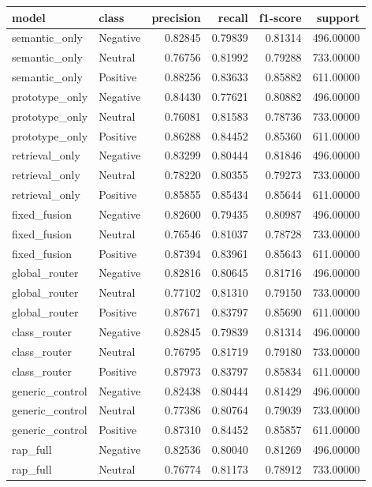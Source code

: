 \begin{tabular}{llrrrr}
\toprule
model & class & precision & recall & f1-score & support \\
\midrule
semantic_only & Negative & 0.82845 & 0.79839 & 0.81314 & 496.00000 \\
semantic_only & Neutral & 0.76756 & 0.81992 & 0.79288 & 733.00000 \\
semantic_only & Positive & 0.88256 & 0.83633 & 0.85882 & 611.00000 \\
prototype_only & Negative & 0.84430 & 0.77621 & 0.80882 & 496.00000 \\
prototype_only & Neutral & 0.76081 & 0.81583 & 0.78736 & 733.00000 \\
prototype_only & Positive & 0.86288 & 0.84452 & 0.85360 & 611.00000 \\
retrieval_only & Negative & 0.83299 & 0.80444 & 0.81846 & 496.00000 \\
retrieval_only & Neutral & 0.78220 & 0.80355 & 0.79273 & 733.00000 \\
retrieval_only & Positive & 0.85855 & 0.85434 & 0.85644 & 611.00000 \\
fixed_fusion & Negative & 0.82600 & 0.79435 & 0.80987 & 496.00000 \\
fixed_fusion & Neutral & 0.76546 & 0.81037 & 0.78728 & 733.00000 \\
fixed_fusion & Positive & 0.87394 & 0.83961 & 0.85643 & 611.00000 \\
global_router & Negative & 0.82816 & 0.80645 & 0.81716 & 496.00000 \\
global_router & Neutral & 0.77102 & 0.81310 & 0.79150 & 733.00000 \\
global_router & Positive & 0.87671 & 0.83797 & 0.85690 & 611.00000 \\
class_router & Negative & 0.82845 & 0.79839 & 0.81314 & 496.00000 \\
class_router & Neutral & 0.76795 & 0.81719 & 0.79180 & 733.00000 \\
class_router & Positive & 0.87973 & 0.83797 & 0.85834 & 611.00000 \\
generic_control & Negative & 0.82438 & 0.80444 & 0.81429 & 496.00000 \\
generic_control & Neutral & 0.77386 & 0.80764 & 0.79039 & 733.00000 \\
generic_control & Positive & 0.87310 & 0.84452 & 0.85857 & 611.00000 \\
rap_full & Negative & 0.82536 & 0.80040 & 0.81269 & 496.00000 \\
rap_full & Neutral & 0.76774 & 0.81173 & 0.78912 & 733.00000 \\

\end{tabular}
